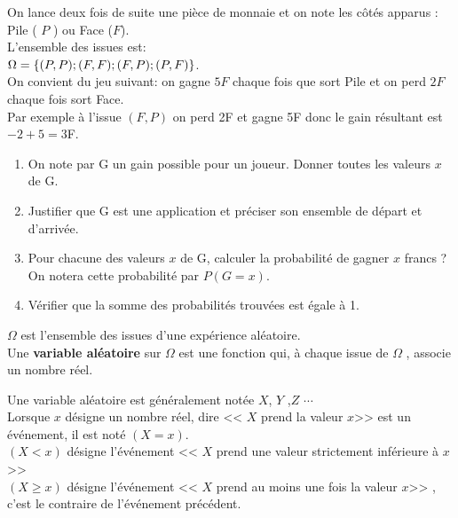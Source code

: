 
\everymath{\displaystyle}

  
  \begin{lemma}
 On lance deux fois de suite une pièce de monnaie  et on note  les côtés apparus :  Pile ( $ P$ ) ou Face ($F $).\\L'ensemble des issues est:\\ $ \Omega=\left\{(P,P);(F,F);(F,P);(P,F)\right\} $.\\ On convient du jeu suivant: on  gagne $ 5F $  chaque fois que sort Pile et on perd $ 2F $ chaque fois sort Face. \\ Par exemple à l'issue $ (F,P) $ on perd 2F et gagne 5F donc le gain résultant est $ -2+5=3 $F.
 \begin{enumerate}
\item On note par  G un gain  possible pour un joueur. Donner toutes les valeurs $ x $ de G.
\item Justifier que G est une application et préciser  son ensemble de départ et d'arrivée.
\item Pour chacune des valeurs  $ x $  de G, calculer la probabilité de gagner $ x $ francs ?\\ On  notera cette probabilité par $P(G  =x)$.
\item Vérifier que la somme des probabilités trouvées est égale à 1.
\end{enumerate}

  \end{lemma}
\begin{definition}
$ \Omega $  est l'ensemble des issues d'une expérience aléatoire.\\ Une \textbf{variable aléatoire } sur  $ \Omega $  est une fonction qui, à chaque issue de $ \Omega $ , associe un nombre réel.
\end{definition}
 \begin{notation}
 Une variable aléatoire  est généralement notée $X $, $ Y $ ,$Z $ $ \cdots $\\ Lorsque $ x $ désigne un nombre réel, dire << $ X $ prend la valeur $ x $>>  est un événement, il est noté $ (X=x) $.\\$ (X< x) $ désigne l'événement << $ X $ prend une  valeur strictement inférieure à $ x $>> \\
  $ (X\geq x) $ désigne l'événement << $ X $ prend  au moins une fois la  valeur  $ x $>> , c'est le contraire  de l'événement précédent. 
  
   \end{notation}
